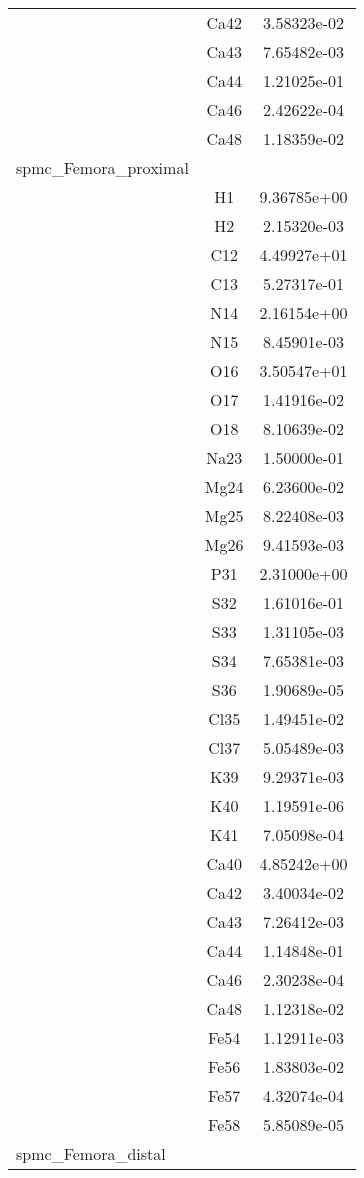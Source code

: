 \begin{centering}
\begin{longtable}{l c c}
& Ca42 & 3.58323e-02 \\ 
& Ca43 & 7.65482e-03 \\ 
& Ca44 & 1.21025e-01 \\ 
& Ca46 & 2.42622e-04 \\ 
& Ca48 & 1.18359e-02 \\ 
\hline
spmc_Femora_proximal & & \\
\hline
& H1 & 9.36785e+00 \\ 
& H2 & 2.15320e-03 \\ 
& C12 & 4.49927e+01 \\ 
& C13 & 5.27317e-01 \\ 
& N14 & 2.16154e+00 \\ 
& N15 & 8.45901e-03 \\ 
& O16 & 3.50547e+01 \\ 
& O17 & 1.41916e-02 \\ 
& O18 & 8.10639e-02 \\ 
& Na23 & 1.50000e-01 \\ 
& Mg24 & 6.23600e-02 \\ 
& Mg25 & 8.22408e-03 \\ 
& Mg26 & 9.41593e-03 \\ 
& P31 & 2.31000e+00 \\ 
& S32 & 1.61016e-01 \\ 
& S33 & 1.31105e-03 \\ 
& S34 & 7.65381e-03 \\ 
& S36 & 1.90689e-05 \\ 
& Cl35 & 1.49451e-02 \\ 
& Cl37 & 5.05489e-03 \\ 
& K39 & 9.29371e-03 \\ 
& K40 & 1.19591e-06 \\ 
& K41 & 7.05098e-04 \\ 
& Ca40 & 4.85242e+00 \\ 
& Ca42 & 3.40034e-02 \\ 
& Ca43 & 7.26412e-03 \\ 
& Ca44 & 1.14848e-01 \\ 
& Ca46 & 2.30238e-04 \\ 
& Ca48 & 1.12318e-02 \\ 
& Fe54 & 1.12911e-03 \\ 
& Fe56 & 1.83803e-02 \\ 
& Fe57 & 4.32074e-04 \\ 
& Fe58 & 5.85089e-05 \\ 
\hline
spmc_Femora_distal & & \\

\end{longtable}
\end{centering}
